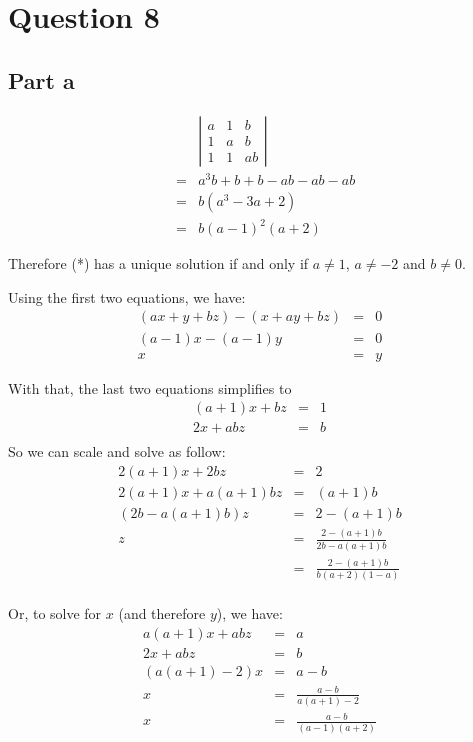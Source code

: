 \section*{Question 8}
\subsection*{Part a}
\begin{eqnarray*}
  & & \left|\begin{array}{ccc}
    a & 1 & b \\
    1 & a & b \\
    1 & 1 & ab
  \end{array}\right| \\
  &=& a^3 b + b + b - ab - ab - ab \\
  &=& b(a^3 -3a + 2) \\
  &=& b(a - 1)^2(a + 2)
\end{eqnarray*}

Therefore (*) has a unique solution if and only if $ a \ne 1 $, $ a \ne -2 $ and $ b \ne 0 $.

Using the first two equations, we have:
\begin{eqnarray*}
  (ax + y + bz) - (x + ay + bz) &=& 0 \\
  (a-1)x - (a - 1)y &=& 0 \\
  x &=& y
\end{eqnarray*}

With that, the last two equations simplifies to
\begin{eqnarray*}
  (a + 1)x + bz &=& 1 \\
  2x + abz &=& b \\
\end{eqnarray*}
So we can scale and solve as follow:
\begin{eqnarray*}
  2(a+1)x + 2bz &=& 2 \\
  2(a+1)x + a(a+1)bz &=& (a+1)b \\
  (2b - a(a+1)b)z &=& 2 - (a+1)b \\
  z &=& \frac{2 - (a+1)b}{2b - a(a+1)b} \\
  &=& \frac{2 - (a+1)b}{b(a + 2)(1 - a)} \\
\end{eqnarray*}

Or, to solve for $ x $ (and therefore $ y $), we have:
\begin{eqnarray*}
  a(a + 1)x + abz &=& a \\
  2x + abz &=& b \\
  (a(a+1) - 2)x &=& a - b \\
  x &=& \frac{a - b}{a(a+1) - 2} \\
  x &=& \frac{a - b}{(a-1)(a+2)}
\end{eqnarray*}

